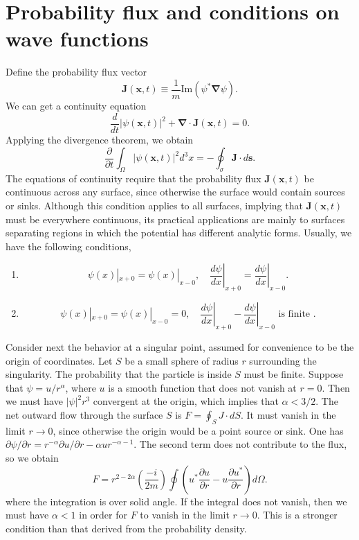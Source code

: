 \section{Probability flux and conditions on wave functions}
\noindent
Define the probability flux vector
\[\bm{J}(\bm{x},t) \equiv \frac{1}{m} \mathrm{Im}(\psi^*\bm{\nabla}\psi).\]
We can get a continuity equation
\[\frac{d}{dt} |\psi(\bm{x},t)|^2 + \bm{\nabla} \cdot \bm{J}(\bm{x},t) = 0.\]
Applying the divergence theorem, we obtain
\[\frac{\partial}{\partial t} \int_{\Omega} |\psi(\bm{x},t)|^2 d^3x = - \oint_{\sigma} \bm{J} \cdot d\bm{s}.\]
The equations of continuity require that the probability
flux $\bm{J}(\bm{x},t)$ be continuous across any surface, since otherwise the surface would contain sources or sinks. Although this condition applies to all surfaces, implying that $\bm{J}(\bm{x},t)$ must be everywhere continuous, its practical applications are mainly to surfaces separating regions in which the potential has different analytic forms.
Usually, we have the following conditions,
\begin{enumerate}
\item \[\psi(x)|_{x+0} = \psi(x)|_{x-0} , \quad \left. \frac{d\psi}{dx}\right|_{x+0} = \left. \frac{d\psi}{dx} \right|_{x-0}.\]
\item \[\psi(x)|_{x+0} = \psi(x)|_{x-0} = 0 , \quad \left. \frac{d\psi}{dx}\right|_{x+0} - \left. \frac{d\psi}{dx} \right|_{x-0} \mbox{ is finite }.\]
\end{enumerate}
\noindent
Consider next the behavior at a singular point, assumed for convenience to be the origin of coordinates. Let $S$ be a small sphere of radius $r$ surrounding the singularity. The probability that the particle is inside $S$ must be finite.
Suppose that $\psi = {u}/{r^{\alpha}}$, where $u$ is a smooth function that does not vanish at $r=0$. Then we must have $|\psi|^2 r^3$ convergent at the origin, which implies that $\alpha < 3/2$.
The net outward flow through the surface $S$ is $F = \oint_{S} J \cdot dS$. It must vanish in the limit $r \to 0$, since otherwise the origin would be a point source or sink.
One has ${\partial \psi}/{\partial r} = r^{-\alpha} {\partial u}/{\partial r} - \alpha u r^{-\alpha-1}$. The second term does not contribute to the flux, so we obtain
\[F = r^{2-2\alpha} \left( \frac{-i}{2m} \right) \oint \left( u^* \frac{\partial u}{\partial r} - u\frac{\partial u^*}{\partial r} \right) d\Omega.\]
where the integration is over solid angle. If the integral does not vanish, then we must have $\alpha <1$ in order for $F$ to vanish in the limit $r \to 0$. This is a stronger condition than that derived from the probability density. 
